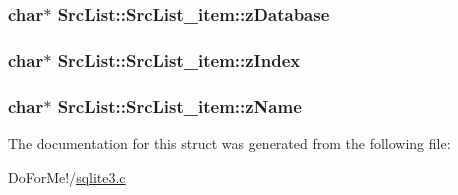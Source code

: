 \hypertarget{struct_src_list_1_1_src_list__item_a2f7bf0921794dc46d74d2546fc10f7de}{
\subsubsection[{z\-Database}]{\setlength{\rightskip}{0pt plus 5cm}char$\ast$ Src\-List\-::\-Src\-List\-\_\-item\-::z\-Database}}\label{struct_src_list_1_1_src_list__item_a2f7bf0921794dc46d74d2546fc10f7de}
\hypertarget{struct_src_list_1_1_src_list__item_a72b8e117712e49607b770a462fb42d95}{
\subsubsection[{z\-Index}]{\setlength{\rightskip}{0pt plus 5cm}char$\ast$ Src\-List\-::\-Src\-List\-\_\-item\-::z\-Index}}\label{struct_src_list_1_1_src_list__item_a72b8e117712e49607b770a462fb42d95}
\hypertarget{struct_src_list_1_1_src_list__item_afee5c5a84594fed8100be3cdb3e3ff1c}{
\subsubsection[{z\-Name}]{\setlength{\rightskip}{0pt plus 5cm}char$\ast$ Src\-List\-::\-Src\-List\-\_\-item\-::z\-Name}}\label{struct_src_list_1_1_src_list__item_afee5c5a84594fed8100be3cdb3e3ff1c}


The documentation for this struct was generated from the following file\-:\begin{DoxyCompactItemize}
\item 
Do\-For\-Me!/\hyperlink{sqlite3_8c}{sqlite3.\-c}\end{DoxyCompactItemize}
